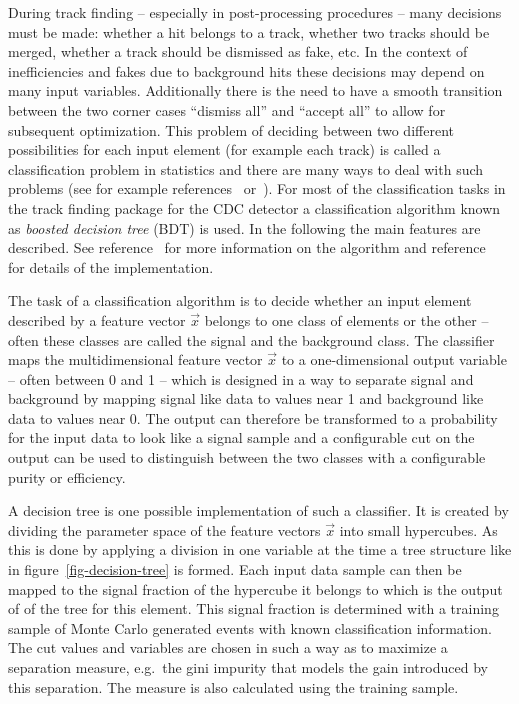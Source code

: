 During track finding -- especially in post-processing procedures -- many decisions must be made: whether a hit belongs to a track, whether two tracks should be merged, whether a track should be dismissed as fake, etc. In the context of inefficiencies and fakes due to background hits these decisions may depend on many input variables. Additionally there is the need to have a smooth transition between the two corner cases ``dismiss all'' and ``accept all'' to allow for subsequent optimization. This problem of deciding between two different possibilities for each input element (for example each track) is called a classification problem in statistics and there are many ways to deal with such problems (see for example references~\cite{cowan} or~\cite{blobel}). For most of the classification tasks in the track finding package for the CDC detector a classification algorithm known as \emph{boosted decision tree} (BDT) is used. In the following the main features are described. See reference~\cite{friedman} for more information on the algorithm and reference~\cite{keck} for details of the implementation.

The task of a classification algorithm is to decide whether an input element described by a feature vector $\vec x$ belongs to one class of elements or the other -- often these classes are called the signal and the background class. The classifier maps the multidimensional feature vector $\vec x$ to a one-dimensional output variable -- often between 0 and 1 -- which is designed in a way to separate signal and background by mapping signal like data to values near 1 and background like data to values near 0. The output can therefore be transformed to a probability for the input data to look like a signal sample and a configurable cut on the output can be used to distinguish between the two classes with a configurable purity or efficiency.

A decision tree is one possible implementation of such a classifier. It is created by dividing the parameter space of the feature vectors $\vec x$ into small hypercubes. As this is done by applying a division in one variable at the time a tree structure like in figure~\ref{fig-decision-tree} is formed. Each input data sample can then be mapped to the signal fraction of the hypercube it belongs to which is the output of of the tree for this element. This signal fraction is determined with a training sample of Monte Carlo generated events with known classification information. The cut values and variables are chosen in such a way as to maximize a separation measure, e.g.\ the gini impurity that models the gain introduced by this separation. The measure is also calculated using the training sample.

